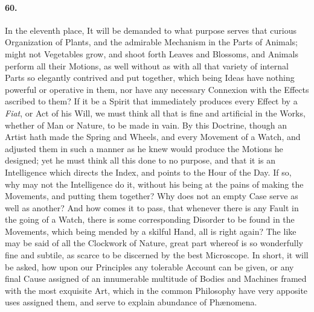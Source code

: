 \documentclass[]{article}
\newenvironment{sectionbody}{}{}
\begin{document}
\begin{sectionbody}
\paragraph{60.} In the eleventh place, It will be demanded to what purpose serves
that curious Organization of Plants, and the admirable Mechanism
in the Parts of Animals; might not Vegetables grow, and shoot
forth Leaves and Blossoms, and Animals perform all their Motions,
as well without as with all that variety of internal Parts so
elegantly contrived and put together, which being Ideas have
nothing powerful or operative in them, nor have any necessary
Connexion with the Effects ascribed to them? If it be a Spirit
that immediately produces every Effect by a \emph{Fiat}, or Act
of his Will, we must think all that is fine and artificial in the
Works, whether of Man or Nature, to be made in vain.  By this
Doctrine, though an Artist hath made the Spring and Wheels, and
every Movement of a Watch, and adjusted them in such a manner as
he knew would produce the Motions he designed; yet he must think
all this done to no purpose, and that it is an Intelligence which
directs the Index, and points to the Hour of the Day.  If so, why
may not the Intelligence do it, without his being at the pains of
making the Movements, and putting them together? Why does not an
empty Case serve as well as another? And how comes it to pass,
that whenever there is any Fault in the going of a Watch, there
is some corresponding Disorder to be found in the Movements,
which being mended by a skilful Hand, all is right again?  The
like may be said of all the Clockwork of Nature, great part
whereof is so wonderfully fine and subtile, as scarce to be
discerned by the best Microscope.  In short, it will be asked,
how upon our Principles any tolerable Account can be given, or
any final Cause assigned of an innumerable multitude of Bodies
and Machines framed with the most exquisite Art, which in the
common Philosophy have very apposite uses assigned them, and
serve to explain abundance of Ph{\ae}nomena.




\end{sectionbody}
\end{document}
